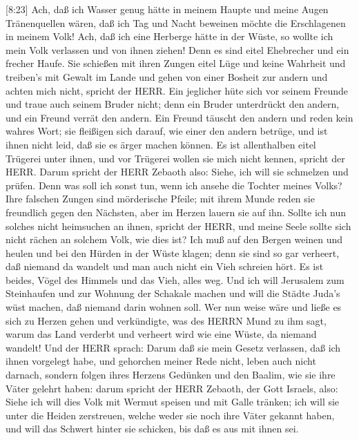  {[}8:23{]} Ach, daß ich Wasser genug hätte in meinem Haupte
und meine Augen Tränenquellen wären, daß ich Tag und Nacht beweinen
möchte die Erschlagenen in meinem Volk!  Ach, daß ich eine
Herberge hätte in der Wüste, so wollte ich mein Volk verlassen und von
ihnen ziehen! Denn es sind eitel Ehebrecher und ein frecher Haufe.
 Sie schießen mit ihren Zungen eitel Lüge und keine Wahrheit
und treiben's mit Gewalt im Lande und gehen von einer Bosheit zur andern
und achten mich nicht, spricht der HERR.  Ein jeglicher hüte
sich vor seinem Freunde und traue auch seinem Bruder nicht; denn ein
Bruder unterdrückt den andern, und ein Freund verrät den andern.
 Ein Freund täuscht den andern und reden kein wahres Wort;
sie fleißigen sich darauf, wie einer den andern betrüge, und ist ihnen
nicht leid, daß sie es ärger machen können.  Es ist
allenthalben eitel Trügerei unter ihnen, und vor Trügerei wollen sie
mich nicht kennen, spricht der HERR.  Darum spricht der HERR
Zebaoth also: Siehe, ich will sie schmelzen und prüfen. Denn was soll
ich sonst tun, wenn ich ansehe die Tochter meines Volks? 
Ihre falschen Zungen sind mörderische Pfeile; mit ihrem Munde reden sie
freundlich gegen den Nächsten, aber im Herzen lauern sie auf ihn.
 Sollte ich nun solches nicht heimsuchen an ihnen, spricht
der HERR, und meine Seele sollte sich nicht rächen an solchem Volk, wie
dies ist?  Ich muß auf den Bergen weinen und heulen und bei
den Hürden in der Wüste klagen; denn sie sind so gar verheert, daß
niemand da wandelt und man auch nicht ein Vieh schreien hört. Es ist
beides, Vögel des Himmels und das Vieh, alles weg.  Und ich
will Jerusalem zum Steinhaufen und zur Wohnung der Schakale machen und
will die Städte Juda's wüst machen, daß niemand darin wohnen soll.
 Wer nun weise wäre und ließe es sich zu Herzen gehen und
verkündigte, was des HERRN Mund zu ihm sagt, warum das Land verderbt und
verheert wird wie eine Wüste, da niemand wandelt!  Und der
HERR sprach: Darum daß sie mein Gesetz verlassen, daß ich ihnen
vorgelegt habe, und gehorchen meiner Rede nicht, leben auch nicht
darnach,  sondern folgen ihres Herzens Gedünken und den
Baalim, wie sie ihre Väter gelehrt haben:  darum spricht
der HERR Zebaoth, der Gott Israels, also: Siehe ich will dies Volk mit
Wermut speisen und mit Galle tränken;  ich will sie unter
die Heiden zerstreuen, welche weder sie noch ihre Väter gekannt haben,
und will das Schwert hinter sie schicken, bis daß es aus mit ihnen sei.
